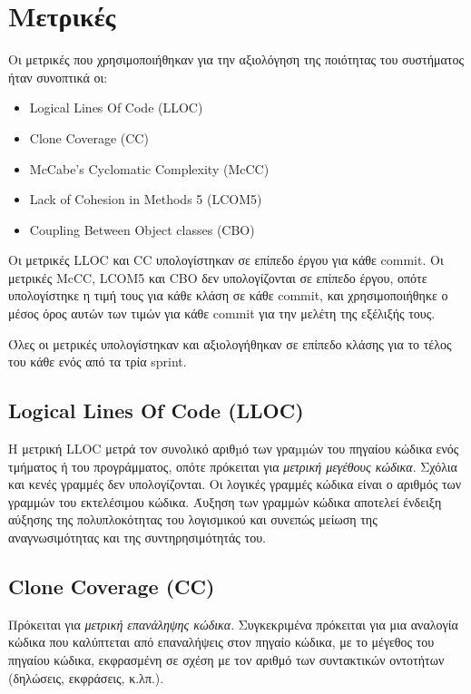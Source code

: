 \section{Μετρικές}

Οι μετρικές που χρησιμοποιήθηκαν για την αξιολόγηση της ποιότητας του
συστήματος ήταν συνοπτικά οι:
\begin{itemize}
	\item Logical Lines Of Code (LLOC)
	\item Clone Coverage (CC)
	\item McCabe's Cyclomatic Complexity (McCC)
	\item Lack of Cohesion in Methods 5 (LCOM5)
	\item Coupling Between Object classes (CBO)
\end{itemize}

Οι μετρικές LLOC και CC υπολογίστηκαν σε επίπεδο έργου για κάθε commit.
Οι μετρικές McCC, LCOM5 και CBO δεν υπολογίζονται σε επίπεδο έργου,
οπότε υπολογίστηκε η τιμή τους για κάθε κλάση σε κάθε commit, και
χρησιμοποιήθηκε ο μέσος όρος αυτών των τιμών για κάθε commit για την
μελέτη της εξέλιξής τους.

Όλες οι μετρικές υπολογίστηκαν και αξιολογήθηκαν σε επίπεδο κλάσης για
το τέλος του κάθε ενός από τα τρία sprint.

\subsection{Logical Lines Of Code (LLOC)}

Η μετρική LLOC μετρά τον συνολικό αριθµό των γραµµών του πηγαίου κώδικα
ενός τμήματος ή του προγράμματος, οπότε πρόκειται για \emph{μετρική
μεγέθους κώδικα}. Σχόλια και κενές γραμμές δεν υπολογίζονται. Οι
λογικές γραμμές κώδικα είναι ο αριθμός των γραμμών του εκτελέσιμου
κώδικα. Άυξηση των γραμμών κώδικα αποτελεί
ένδειξη αύξησης της πολυπλοκότητας του λογισμικού και συνεπώς μείωση της
αναγνωσιμότητας και της συντηρησιμότητάς του.

\subsection{Clone Coverage (CC)}

Πρόκειται για \emph{μετρική επανάληψης κώδικα}. Συγκεκριμένα πρόκειται
για μια αναλογία κώδικα που καλύπτεται από επαναλήψεις στον πηγαίο
κώδικα, με το μέγεθος του πηγαίου κώδικα, εκφρασμένη σε σχέση με τον
αριθμό των συντακτικών οντοτήτων (δηλώσεις, εκφράσεις, κ.λπ.).

